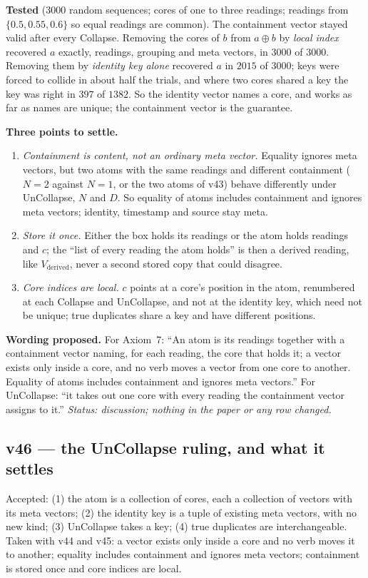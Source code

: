 \documentclass[11pt]{article}
\begin{document}
\textbf{Tested} ($3000$ random sequences; cores of one to three readings; readings from $\{0.5,0.55,0.6\}$ so equal readings are common). The containment vector stayed valid after every Collapse. Removing the cores of $b$ from $a\oplus b$ by \emph{local index} recovered $a$
exactly, readings, grouping and meta vectors, in $3000$ of $3000$. Removing them by \emph{identity key alone} recovered $a$ in $2015$ of $3000$; keys were forced to collide in about half the trials, and where two cores shared a key the
key was right in $397$ of $1382$. So the identity vector names a core, and works as far as names are unique; the containment vector is the guarantee.

\textbf{Three points to settle.}
\begin{enumerate}
\item \emph{Containment is content, not an ordinary meta vector.} Equality ignores meta vectors, but two atoms with the same readings and different containment ($N=2$ against $N=1$, or the two atoms of v43) behave differently under UnCollapse,
$N$ and $D$. So equality of atoms includes containment and ignores meta vectors; identity, timestamp and source stay meta.
\item \emph{Store it once.} Either the box holds its readings or the atom holds readings and $c$; the ``list of every reading the atom holds'' is then a derived reading, like $V_{\text{derived}}$, never a second stored copy that could disagree.
\item \emph{Core indices are local.} $c$ points at a core's position in the atom, renumbered at each Collapse and UnCollapse, and not at the identity key, which need not be unique; true duplicates share a key and have different positions.
\end{enumerate}

\textbf{Wording proposed.} For Axiom~7: ``An atom is its readings together with a containment vector naming, for each reading, the core that holds it; a vector exists only inside a core, and no verb moves a vector from one core to another. Equality of atoms includes
containment and ignores meta vectors.'' For UnCollapse: ``it takes out one core with every reading the containment vector assigns to it.''
\emph{Status: discussion; nothing in the paper or any row changed.}


\subsection*{v46 --- the UnCollapse ruling, and what it settles}
Accepted: (1) the atom is a collection of cores, each a collection of vectors with its meta vectors; (2) the identity key is a tuple of existing meta vectors, with no new kind;
(3) UnCollapse takes a key; (4) true duplicates are interchangeable. Taken with v44 and v45: a vector exists only inside a core and no verb moves it to another; equality includes containment and ignores meta vectors;
containment is stored once and core indices are local.
\end{document}
